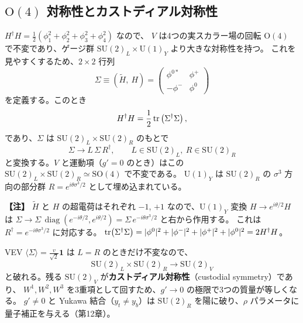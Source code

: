 \documentclass[uplatex,dvipdfmx,a4paper,11pt,openany]{jsbook}
\newcommand{\term}[2]{\textbf{#1}（#2）}
\newenvironment{note}{\vspace{1ex}\par\footnotesize\noindent\textbf{【注】}}{\par\vspace{1ex}}
\numberwithin{equation}{chapter}
\theoremstyle{definition}
\theoremstyle{plain}
\theoremstyle{remark}
\newcommand{\SU}{\mathrm{SU}}
\newcommand{\U}{\mathrm{U}}
\newcommand{\SO}{\mathrm{SO}}
\newcommand{\diag}{\operatorname{diag}}
\begin{document}
\subsection{$\mathrm O(4)$ 対称性とカストディアル対称性}
$H^\dagger H=\frac12(\phi_1^2+\phi_2^2+\phi_3^2+\phi_4^2)$ なので、
$V$ は4つの実スカラー場の回転 $\mathrm O(4)$ で不変であり、ゲージ群 $\SU(2)_L\times\U(1)_Y$ より大きな対称性を持つ。
これを見やすくするため、$2\times2$ 行列
\begin{equation}
\Sigma\equiv\left(\tilde H,\ H\right)
=\begin{pmatrix}\phi^{0*}&\phi^+\\ -\phi^-&\phi^0\end{pmatrix}
\label{eq:bidoublet}
\end{equation}
を定義する。このとき
\begin{equation}
H^\dagger H=\frac12\tr\left(\Sigma^\dagger\Sigma\right),
\end{equation}
であり、$\Sigma$ は $\SU(2)_L\times\SU(2)_R$ のもとで
\begin{equation}
\Sigma\to L\,\Sigma\,R^\dagger,\qquad L\in\SU(2)_L,\ R\in\SU(2)_R
\end{equation}
と変換する。$V$ と運動項（$g'=0$ のとき）はこの $\SU(2)_L\times\SU(2)_R\simeq\SO(4)$ で不変である。
$\U(1)_Y$ は $\SU(2)_R$ の $\sigma^3$ 方向の部分群 $R=e^{i\theta\sigma^3/2}$ として埋め込まれている。
\begin{note}
$\tilde H$ と $H$ の超電荷はそれぞれ $-1$, $+1$ なので、$\U(1)_Y$ 変換 $H\to e^{i\theta/2}H$ は
$\Sigma\to\Sigma\,\diag(e^{-i\theta/2},e^{i\theta/2})=\Sigma\,e^{-i\theta\sigma^3/2}$ と右から作用する。
これは $R^\dagger=e^{-i\theta\sigma^3/2}$ に対応する。
$\tr(\Sigma^\dagger\Sigma)=|\phi^0|^2+|\phi^-|^2+|\phi^+|^2+|\phi^0|^2=2H^\dagger H$。
\end{note}
VEV $\langle\Sigma\rangle=\frac{v}{\sqrt2}\mathbf 1$ は $L=R$ のときだけ不変なので、
\begin{equation}
\SU(2)_L\times\SU(2)_R\to\SU(2)_V
\end{equation}
と破れる。残る $\SU(2)_V$ が\term{カストディアル対称性}{custodial symmetry}であり、
$W^1,W^2,W^3$ を3重項として回すため、$g'\to0$ の極限で3つの質量が等しくなる。
$g'\ne0$ と Yukawa 結合（$y_t\ne y_b$）は $\SU(2)_R$ を陽に破り、$\rho$ パラメータに量子補正を与える（第12章）。
\end{document}
